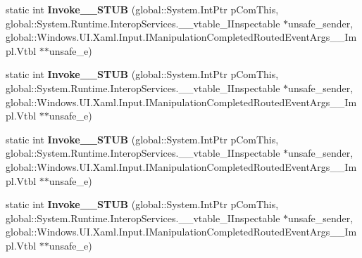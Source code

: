 \begin{DoxyCompactItemize}
\item 
\mbox{\label{struct_windows_1_1_u_i_1_1_xaml_1_1_input_1_1_manipulation_completed_event_handler_____impl_1_1_vtbl_aa8549f1e3e7afc5919e4f7e0687bdd54}} 
static int {\bfseries Invoke\+\_\+\+\_\+\+S\+T\+UB} (global\+::\+System.\+Int\+Ptr p\+Com\+This, global\+::\+System.\+Runtime.\+Interop\+Services.\+\_\+\+\_\+vtable\+\_\+\+I\+Inspectable $\ast$unsafe\+\_\+sender, global\+::\+Windows.\+U\+I.\+Xaml.\+Input.\+I\+Manipulation\+Completed\+Routed\+Event\+Args\+\_\+\+\_\+\+Impl.\+Vtbl $\ast$$\ast$unsafe\+\_\+e)
\item 
\mbox{\label{struct_windows_1_1_u_i_1_1_xaml_1_1_input_1_1_manipulation_completed_event_handler_____impl_1_1_vtbl_aa8549f1e3e7afc5919e4f7e0687bdd54}} 
static int {\bfseries Invoke\+\_\+\+\_\+\+S\+T\+UB} (global\+::\+System.\+Int\+Ptr p\+Com\+This, global\+::\+System.\+Runtime.\+Interop\+Services.\+\_\+\+\_\+vtable\+\_\+\+I\+Inspectable $\ast$unsafe\+\_\+sender, global\+::\+Windows.\+U\+I.\+Xaml.\+Input.\+I\+Manipulation\+Completed\+Routed\+Event\+Args\+\_\+\+\_\+\+Impl.\+Vtbl $\ast$$\ast$unsafe\+\_\+e)
\item 
\mbox{\label{struct_windows_1_1_u_i_1_1_xaml_1_1_input_1_1_manipulation_completed_event_handler_____impl_1_1_vtbl_aa8549f1e3e7afc5919e4f7e0687bdd54}} 
static int {\bfseries Invoke\+\_\+\+\_\+\+S\+T\+UB} (global\+::\+System.\+Int\+Ptr p\+Com\+This, global\+::\+System.\+Runtime.\+Interop\+Services.\+\_\+\+\_\+vtable\+\_\+\+I\+Inspectable $\ast$unsafe\+\_\+sender, global\+::\+Windows.\+U\+I.\+Xaml.\+Input.\+I\+Manipulation\+Completed\+Routed\+Event\+Args\+\_\+\+\_\+\+Impl.\+Vtbl $\ast$$\ast$unsafe\+\_\+e)
\item 
\mbox{\label{struct_windows_1_1_u_i_1_1_xaml_1_1_input_1_1_manipulation_completed_event_handler_____impl_1_1_vtbl_aa8549f1e3e7afc5919e4f7e0687bdd54}} 
static int {\bfseries Invoke\+\_\+\+\_\+\+S\+T\+UB} (global\+::\+System.\+Int\+Ptr p\+Com\+This, global\+::\+System.\+Runtime.\+Interop\+Services.\+\_\+\+\_\+vtable\+\_\+\+I\+Inspectable $\ast$unsafe\+\_\+sender, global\+::\+Windows.\+U\+I.\+Xaml.\+Input.\+I\+Manipulation\+Completed\+Routed\+Event\+Args\+\_\+\+\_\+\+Impl.\+Vtbl $\ast$$\ast$unsafe\+\_\+e)

\end{DoxyCompactItemize}
